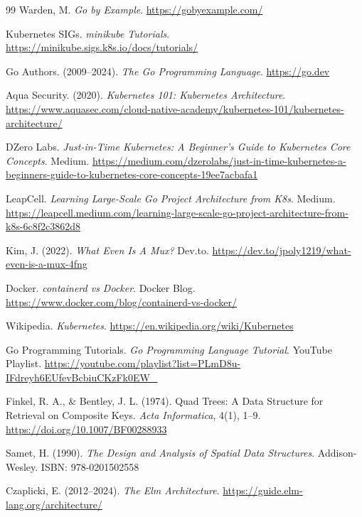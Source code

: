 \documentclass[11pt]{article}
\begin{document}
\begin{thebibliography}{99}
Warden, M. \textit{Go by Example}.
\url{https://gobyexample.com/}

Kubernetes SIGs. \textit{minikube Tutorials}.
\url{https://minikube.sigs.k8s.io/docs/tutorials/}

Go Authors. (2009--2024). \textit{The Go Programming Language}.
\url{https://go.dev}




Aqua Security. (2020). \textit{Kubernetes 101: Kubernetes Architecture}.
\url{https://www.aquasec.com/cloud-native-academy/kubernetes-101/kubernetes-architecture/}

DZero Labs. \textit{Just-in-Time Kubernetes: A Beginner's Guide to Kubernetes Core Concepts}.
Medium. \url{https://medium.com/dzerolabs/just-in-time-kubernetes-a-beginners-guide-to-kubernetes-core-concepts-19ee7acbafa1}

LeapCell. \textit{Learning Large-Scale Go Project Architecture from K8s}.
Medium. \url{https://leapcell.medium.com/learning-large-scale-go-project-architecture-from-k8s-6c8f2c3862d8}

Kim, J. (2022). \textit{What Even Is A Mux?}
Dev.to. \url{https://dev.to/jpoly1219/what-even-is-a-mux-4fng}

Docker. \textit{containerd vs Docker}.
Docker Blog. \url{https://www.docker.com/blog/containerd-vs-docker/}

Wikipedia. \textit{Kubernetes}.
\url{https://en.wikipedia.org/wiki/Kubernetes}




Go Programming Tutorials. \textit{Go Programming Language Tutorial}.
YouTube Playlist. \url{https://youtube.com/playlist?list=PLmD8u-IFdreyh6EUfevBcbiuCKzFk0EW_}




Finkel, R. A., \& Bentley, J. L. (1974). Quad Trees: A Data Structure for Retrieval on Composite Keys.
\textit{Acta Informatica}, 4(1), 1--9. \url{https://doi.org/10.1007/BF00288933}

Samet, H. (1990). \textit{The Design and Analysis of Spatial Data Structures}.
Addison-Wesley. ISBN: 978-0201502558




Czaplicki, E. (2012--2024). \textit{The Elm Architecture}.
\url{https://guide.elm-lang.org/architecture/}


\end{thebibliography}
\end{document}
